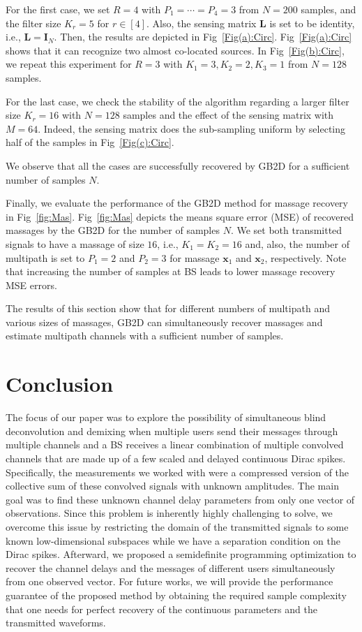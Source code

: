 \documentclass[conference,10pt]{IEEEtran}
\theoremstyle{remark}
\theoremstyle{plain}
\theoremstyle{definition}
\theoremstyle{remark}
\begin{document}
For the first case,  we set $R=4$ with $P_1=\cdots=P_4=3$ from $N=200$ samples, and the filter size $K_r=5$ for $r\in [4]$. Also, the sensing matrix $\bm{L}$ is set to be identity, i.e., $\bm{L}=\bm{I}_N$. Then, the results are depicted in Fig~\ref{Fig(a):Circ}. Fig~\ref{Fig(a):Circ} shows that it can recognize two almost co-located sources. In Fig~\ref{Fig(b):Circ}, we repeat this experiment for $R=3$ with $K_1=3,K_2=2,K_3=1$ from $N=128$ samples.  


For the last case, we check the stability of the algorithm regarding a larger filter size $K_r=16$ with $N=128$ samples and the effect of the sensing matrix with $M=64$. Indeed, the sensing matrix does the sub-sampling uniform by selecting half of the samples  in Fig~\ref{Fig(c):Circ}.

We observe that all the cases are successfully recovered by GB2D for a sufficient number of samples $N$. 

Finally, we evaluate the performance of the GB2D method for massage recovery in Fig~\ref{fig:Mas}.  Fig~\ref{fig:Mas} depicts the means square error (MSE) of recovered massages  by the GB2D for the number of samples $N$. We set both transmitted signals to have a massage of size $16$, i.e.,  $K_1 = K_2= 16$ and, also, the number of multipath is set to $P_1 = 2$ and $P_2 = 3$ for massage $\bm{x}_1$ and $\bm{x}_2$, respectively. Note that increasing the number of samples at BS leads to lower massage recovery MSE errors.  


The results of this section show that for different numbers of multipath and various sizes of massages, GB2D  can simultaneously recover massages and estimate multipath channels with a sufficient number of samples.  


\section{Conclusion}\label{sec.conclusion}

The focus of our paper was to explore the possibility of simultaneous blind deconvolution and demixing when multiple users send their messages through multiple channels and a BS receives a linear combination of multiple convolved channels that are made up of a few scaled and delayed continuous Dirac spikes. Specifically, the measurements we worked with were a compressed version of the collective sum of these convolved signals with unknown amplitudes.
The main goal was to find these unknown channel delay parameters from only one vector of observations. Since this problem is inherently highly challenging to solve, we overcome this issue by restricting the domain of the transmitted signals to some known low-dimensional subspaces while we have a separation condition on the Dirac spikes. Afterward, we proposed a semidefinite programming optimization to recover the channel delays and the messages of different users simultaneously from one observed vector.
For future works, we will provide the performance guarantee of the proposed method by obtaining the required sample complexity that one needs for perfect recovery of the continuous parameters and the transmitted waveforms.
 
\end{document}

